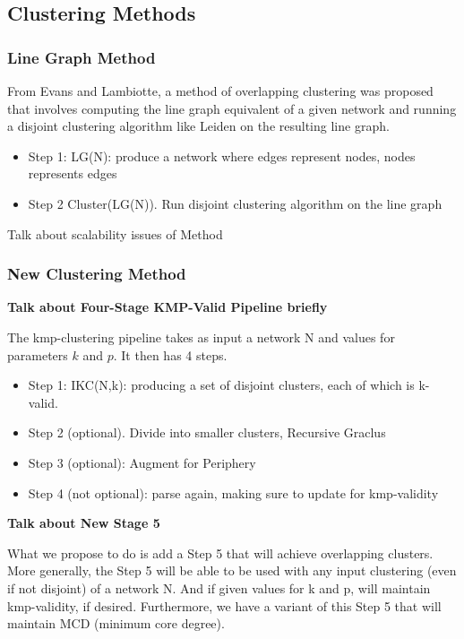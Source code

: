 \documentclass{article}
\begin{document}
\subsection{Clustering Methods}

\subsubsection{Line Graph Method}

From Evans and Lambiotte, a method of overlapping clustering was proposed that involves computing the line graph equivalent of a given network and running a disjoint clustering algorithm like Leiden on the resulting line graph. 
\begin{itemize}
	\item Step 1: LG(N): produce a network where edges represent nodes, nodes represents edges
	\item Step 2 Cluster(LG(N)). Run disjoint clustering algorithm on the line graph
\end{itemize}

Talk about scalability issues of Method

\subsubsection{New Clustering Method}

\textbf{Talk about Four-Stage KMP-Valid Pipeline briefly}

The kmp-clustering pipeline takes as input a network N and values for parameters $k$ and $p$. It then has 4 steps.
\begin{itemize}
	\item Step 1: IKC(N,k): producing a set of disjoint clusters, each of which is k-valid.
	\item Step 2 (optional). Divide into smaller clusters, Recursive Graclus
	\item Step 3 (optional): Augment for Periphery
	\item Step 4 (not optional): parse again, making sure to update for kmp-validity
\end{itemize}

\textbf{Talk about New Stage 5}

What we propose to do is add a Step 5 that will achieve overlapping clusters. More generally, the Step 5 will be able to be used with any input clustering (even if not disjoint) of a network N. And if given values for k and p, will maintain kmp-validity, if desired. Furthermore, we have a variant of this Step 5 that will maintain MCD (minimum core degree).
\end{document}

